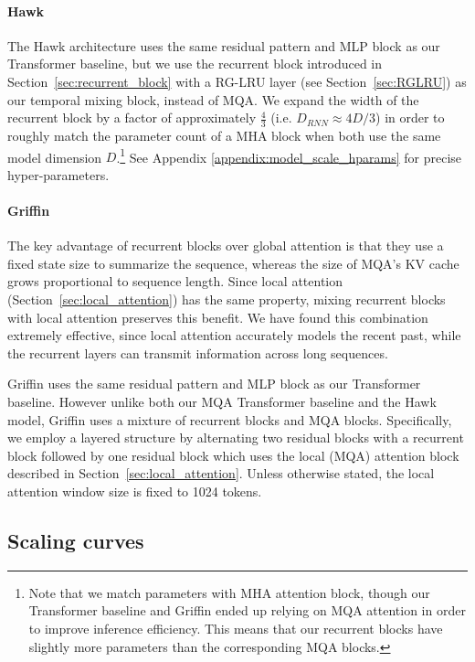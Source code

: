 \documentclass[11pt, a4paper, logo, onecolumn]{googledeepmind}
\theoremstyle{definition}
\begin{document}
\paragraph{Hawk}
\label{sec:hawk}
The Hawk architecture uses the same residual pattern and MLP block as our Transformer baseline, but we use the recurrent block introduced in Section~\ref{sec:recurrent_block} with a RG-LRU layer (see Section~\ref{sec:RGLRU}) as our temporal mixing block, instead of MQA. 
We expand the width of the recurrent block by a factor of approximately $\frac{4}{3}$ (i.e. $D_{RNN} \approx 4D/3$) in order to roughly match the parameter count of a MHA block when both use the same model dimension $D$.\footnote{Note that we match parameters with MHA attention block, though our Transformer baseline and Griffin ended up relying on MQA attention in order to improve inference efficiency. This means that our recurrent blocks have slightly more parameters than the corresponding MQA blocks.} See Appendix \ref{appendix:model_scale_hparams} for precise hyper-parameters.


\paragraph{Griffin}
\label{sec:griffin}

The key advantage of recurrent blocks over global attention is that they use a fixed state size to summarize the sequence, whereas the size of MQA's KV cache grows proportional to sequence length. 
Since local attention (Section~\ref{sec:local_attention}) has the same property, mixing recurrent blocks with local attention preserves this benefit. 
We have found this combination extremely effective, since local attention accurately models the recent past, while the recurrent layers can transmit information across long sequences. 


Griffin uses the same residual pattern and MLP block as our Transformer baseline. However unlike both our MQA Transformer baseline and the Hawk model, Griffin uses a mixture of recurrent blocks and MQA blocks.
Specifically, we employ a layered structure by alternating two residual blocks with a recurrent block followed by one residual block which uses the local (MQA) attention block described in Section~\ref{sec:local_attention}. 
Unless otherwise stated, the local attention window size is fixed to 1024 tokens.




\subsection{Scaling curves}
\end{document}
